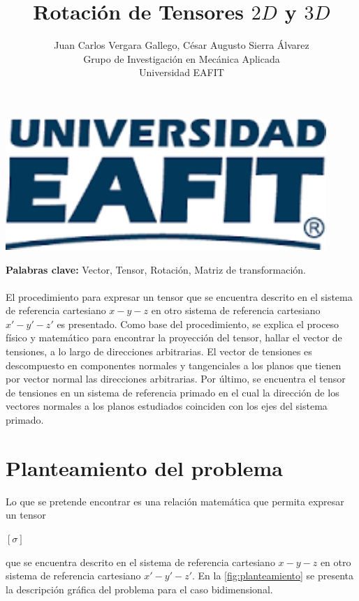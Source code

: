 \documentclass[12pt,letterpaper, twoside, openany]{article}
\author{Juan Carlos Vergara Gallego, César Augusto Sierra Álvarez\\
Grupo de Investigación en Mecánica Aplicada \\ Universidad EAFIT}
\title{\textbf{Rotación de Tensores $2D$ y $3D$}}
\begin{document}
\pagestyle{fancyplain}
\fancyhf{}
\headheight=20pt %
\renewcommand{\headrulewidth}{0pt} %

\lhead %
{
\begin{minipage}{3cm}
\includegraphics[width=1.5 in]{img/logo.pdf}
\end{minipage}
}

\fancyfoot[c]{\thepage}

\maketitle


{\bf Palabras clave:} Vector, Tensor, Rotación, Matriz de transformación.\\\\

\abstract
%
El procedimiento para expresar un tensor que se encuentra descrito en el sistema de referencia cartesiano $x-y-z$ en otro sistema de referencia cartesiano $x'-y'-z'$ es presentado. Como base del procedimiento, se explica el proceso físico y matemático para encontrar la proyección del tensor, hallar el vector de tensiones, a lo largo de direcciones arbitrarias. El vector de tensiones es descompuesto en componentes normales y tangenciales a los planos que tienen por vector normal las direcciones arbitrarias. Por último, se encuentra el tensor de tensiones en un sistema de referencia primado en el cual la dirección de los vectores normales a los planos estudiados coinciden con los ejes del sistema primado.
%
\section{Planteamiento del problema}
%
Lo que se pretende encontrar es una relación matemática que permita  expresar un tensor  \begin{large}$\left[ \sigma \right]$\end{large} que se encuentra descrito en el sistema de referencia cartesiano $x-y-z$ en otro sistema de referencia cartesiano $x'-y'-z'$. En la \cref{fig:planteamiento} se presenta la descripción gráfica del problema para el caso bidimensional.
\end{document}

